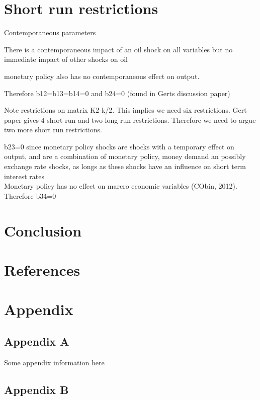 \documentclass[11pt,preprint, authoryear]{elsarticle}
\numberwithin{equation}{section}
\numberwithin{figure}{section}
\numberwithin{table}{section}
\newlength{\cslhangindent}
\newenvironment{CSLReferences}%
  {\setlength{\parindent}{0pt}%
  \everypar{\setlength{\hangindent}{\cslhangindent}}\ignorespaces}%
  {\par}
\begin{document}
\hypertarget{short-run-restrictions}{%
\section{Short run restrictions}\label{short-run-restrictions}}

Contemporaneous parameters

There is a contemporaneous impact of an oil shock on all variables but
no immediate impact of other shocks on oil

monetary policy also has no contemporaneous effect on output.

Therefore b12=b13=b14=0 and b24=0 (found in Gerts discussion paper)

Note restrictions on matrix K2-k/2. This implies we need six
restrictions. Gert paper gives 4 short run and two long run
restrictions. Therefore we need to argue two more short run
restrictions.

b23=0 since monetary policy shocks are shocks with a temporary effect on
output, and are a combination of monetary policy, money demand an
possibly exchange rate shocks, as longs as these shocks have an
influence on short term interest rates\\
Monetary policy has no effect on marcro economic variables (CObin,
2012). Therefore b34=0

\hypertarget{conclusion}{%
\section{Conclusion}\label{conclusion}}

\newpage

\hypertarget{references}{%
\section*{References}\label{references}}

\hypertarget{refs}{}
\begin{CSLReferences}{0}{0}
\end{CSLReferences}

\hypertarget{appendix}{%
\section*{Appendix}\label{appendix}}

\hypertarget{appendix-a}{%
\subsection*{Appendix A}\label{appendix-a}}

Some appendix information here

\hypertarget{appendix-b}{%
\subsection*{Appendix B}\label{appendix-b}}


\end{document}
